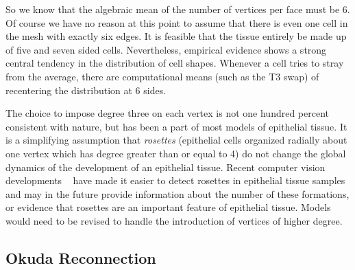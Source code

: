 So we know that the algebraic mean of the number of vertices per face must be 6. Of course we have no reason at this point to assume that there is even one cell in the mesh with exactly six edges. It is feasible that the tissue entirely be made up of five and seven sided cells. Nevertheless, empirical evidence shows a strong central tendency in the distribution of cell shapes. Whenever a cell tries to stray from the average, there are computational means (such as the T3 swap) of recentering the distribution at 6 sides.

The choice to impose degree three on each vertex is not one hundred percent consistent with nature, but has been a part of most models of epithelial tissue.  It is a simplifying assumption that \emph{rosettes} (epithelial cells organized radially about one vertex which has degree greater than or equal to 4) do not change the global dynamics of the development of an epithelial tissue.  Recent computer vision developments ~\cite{rose} have made it easier to detect rosettes in epithelial tissue samples and may in the future provide information about the number of these formations, or evidence that rosettes are an important feature of epithelial tissue. Models would need to be revised to handle the introduction of vertices of higher degree.

\subsection{Okuda Reconnection}
